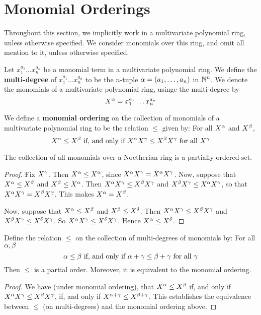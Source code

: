 \section{Monomial Orderings}
\label{section_7.5}

Throughout this section, we implicitly work in a multivariate
polynomial ring, unless otherwise specified. We consider monomials
over this ring, and omit all mention to it, unless otherwise
specified.

\begin{definition}
  Let $x_1^{a_1} \dots x_n^{a_n}$ be a monomial term in a multivariate
  polynomial ring. We define the \textbf{multi-degree} of $x_1^{a_1} \dots
  x_n^{a_n}$ to be the $n$-tuple $\alpha=(a_1, \dots, a_n)$ in $\mathbb{N}^n$. We
  denote the monomials of a multivariate polynomial ring, usinge the
  multi-degree by
  \begin{equation*}
    X^\alpha=x_1^{a_1} \dots x_n^{a_n}
  \end{equation*}
\end{definition}

\begin{definition}
  We define a \textbf{monomial ordering} on the collection of
  monomials of a multivariate polynomial ring to be the relation
  $\leq$ given by: For all $X^\alpha$ and  $X^\beta$,
  \begin{equation*}
    X^\alpha \leq X^\beta \text{ if, and only if }
    X^\alpha X^\gamma \leq X^\beta X^\gamma \text{ for all } X^\gamma
  \end{equation*}
\end{definition}

\begin{proposition}\label{proposition_7.5.1}
  The collection of all monomials over a Noetherian ring is a
  partially ordered set.
\end{proposition}
\begin{proof}
  Fix $X^\gamma$. Then  $X^\alpha \leq X^\alpha$, since $X^\alpha X^\gamma=X^\alpha X^\gamma$.
  Now, suppose that  $X^\alpha \leq X^\beta$ and $X^\beta \leq X^\alpha$. Then $X^\alpha
  X^\gamma \leq X^\beta X^\gamma$  and $X^\beta X^\gamma \leq X^\alpha X^\gamma$, so that
  $X^\alpha X^\gamma=X^\beta X^\gamma$. This makes $X^\alpha=X^\beta$.

  Now, suppose that $X^\alpha \leq X^\beta$ and $X^\beta \leq X^\delta$. Then $X^\alpha
  X^\gamma \leq X^\beta X^\gamma$ and $X^\beta X^\gamma \leq X^\delta X^\gamma$. So
  $X^\alpha X^\gamma \leq X^\delta X^\gamma$. Hence $X^\alpha \leq X^\delta$.
\end{proof}
\begin{corollary}
  Define the relation $\leq$ on the collection of multi-degrees of
  monomials by: For all $\alpha, \beta$
  \begin{equation*}
    \alpha \leq \beta \text{ if, and only if }
    \alpha+\gamma \leq \beta+\gamma \text{ for all } \gamma
  \end{equation*}
  Then $\leq$ is a partial order. Moreover, it is equivalent to the
  monomial ordering.
\end{corollary}
\begin{proof}
  We have (under monomial ordering), that $X^\alpha \leq X^\beta$ if, and only
  if $X^\alpha X^\gamma \leq X^\beta X^\gamma$, if, and only if $X^{\alpha+\gamma} \leq X^{\beta+\gamma}$.
  This establishes the equivalence between $\leq$ (on multi-degrees)
  and the monomial ordering above.
\end{proof}

